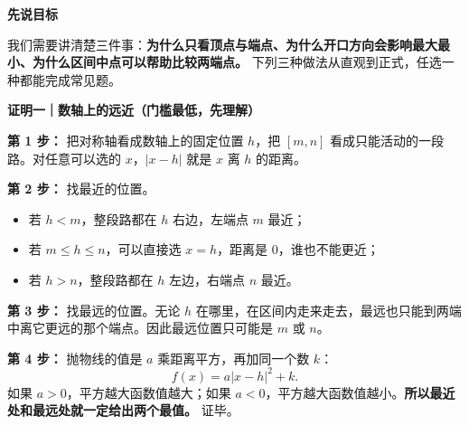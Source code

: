 \clearpage
\begin{proofbox}
\textbf{\textcolor{CProof}{先说目标}}

我们需要讲清楚三件事：\textbf{为什么只看顶点与端点、为什么开口方向会影响最大最小、为什么区间中点可以帮助比较两端点。} 下列三种做法从直观到正式，任选一种都能完成常见题。

\medskip
\textbf{\textcolor{CProof}{证明一｜数轴上的远近（门槛最低，先理解）}}



\textbf{第 1 步：} 把对称轴看成数轴上的固定位置 $h$，把 $[m,n]$ 看成只能活动的一段路。对任意可以选的 $x$，$|x-h|$ 就是 $x$ 离 $h$ 的距离。

\textbf{第 2 步：} 找最近的位置。
\begin{itemize}[leftmargin=*,itemsep=0.2em]
\item 若 $h<m$，整段路都在 $h$ 右边，左端点 $m$ 最近；
\item 若 $m\le h\le n$，可以直接选 $x=h$，距离是 $0$，谁也不能更近；
\item 若 $h>n$，整段路都在 $h$ 左边，右端点 $n$ 最近。
\end{itemize}
\textbf{第 3 步：} 找最远的位置。无论 $h$ 在哪里，在区间内走来走去，最远也只能到两端中离它更远的那个端点。因此最远位置只可能是 $m$ 或 $n$。

\textbf{第 4 步：} 抛物线的值是 $a$ 乘距离平方，再加同一个数 $k$：
\[
 f(x)=a|x-h|^2+k.
\]
如果 $a>0$，平方越大函数值越大；如果 $a<0$，平方越大函数值越小。\textbf{所以最近处和最远处就一定给出两个最值。} 证毕。

\medskip

\end{proofbox}
\clearpage
